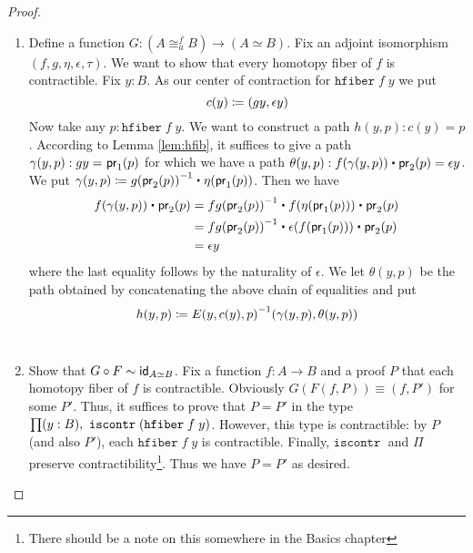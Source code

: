 \begin{proof}
\begin{description}
\begin{enumerate}
\item Define a function $G : (A \cong^f_a B) \to (A \simeq B)$. Fix an adjoint isomorphism $(f,g,\eta,\epsilon,\tau)$. We want to show that every homotopy fiber of $f$ is contractible. Fix $y : B$. As our center of contraction for $\mathtt{hfiber} \; f \;y$ we put 
\[c(y) \defeq (gy, \epsilon y)\]
Now take any $p : \mathtt{hfiber} \; f \;y$. We want to construct a path $h(y,p) : c(y) = p$. According to Lemma \ref{lem:hfib}, it suffices to give a path $\gamma(y,p) : \id{gy}{\proj{1}(p)}$ for which we have a path $\theta(y,p) : f(\gamma(y,p)) \ct \proj{2}(p) = \epsilon y$. We put $\gamma(y,p) \defeq {\opp{g(\proj{2}(p))}} \ct {\eta (\proj{1}(p))}$. Then we have 
\begin{align*}
f(\gamma(y,p)) \ct \proj{2}(p) & = \opp{fg(\proj{2}(p))} \ct {f (\eta(\proj{1}(p)))} \ct \proj{2}(p) \\
& = \opp{fg(\proj{2}(p))} \ct {\epsilon(f(\proj{1}(p)))} \ct \proj{2}(p) \\
& = \epsilon y
\end{align*}
where the last equality follows by the naturality of $\epsilon$. We let $\theta(y,p)$ be the path obtained by concatenating the above chain of equalities and put 
\begin{align*}
 h(y,p) \defeq \opp{E(y,c(y),p)} (\gamma(y,p), \theta(y,p))
\end{align*} \\


\item Show that $G \circ F \sim \idfunc[\eqv A B]$. Fix a function $f : A \to B$ and a proof $P$ that each homotopy fiber of $f$ is contractible. Obviously $G(F(f,P)) \equiv (f,P')$ for some $P'$. Thus, it suffices to prove that $P = P'$ in the type $\prd{y:B} \mathtt{iscontr \;} (\mathtt{hfiber \;} f \; y)$. However, this type is contractible: by $P$ (and also $P'$), each $\mathtt{hfiber} \; f \; y$ is contractible. Finally, $\mathtt{iscontr \;}$ and $\Pi$ preserve contractibility\footnote{There should be a note on this somewhere in the Basics chapter}. Thus we have $P = P'$ as desired. \\




\end{enumerate}
\end{description}
\end{proof}
